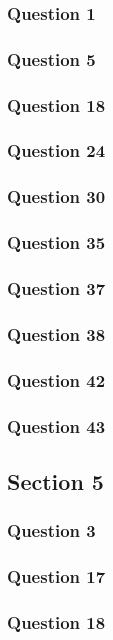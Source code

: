 \documentclass{article}
\begin{document}
\subsubsection{Question 1}
\subsubsection{Question 5}
\subsubsection{Question 18}
\subsubsection{Question 24}
\subsubsection{Question 30}
\subsubsection{Question 35}
\subsubsection{Question 37}
\subsubsection{Question 38}
\subsubsection{Question 42}
\subsubsection{Question 43}

\subsection{Section 5}
\subsubsection{Question 3}
\subsubsection{Question 17}
\subsubsection{Question 18}
\end{document}
